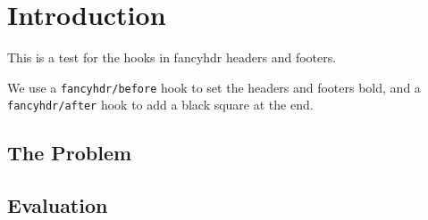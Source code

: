 \documentclass{book}
\begin{document}
\chapter{Introduction}

\begin{boxedminipage}{\textwidth}
This is a test for the hooks in fancyhdr headers and footers.

We use a \texttt{fancyhdr/before} hook to set the headers and footers bold,
and a \texttt{fancyhdr/after} hook to add a black square at the end.
\end{boxedminipage}

\section{The Problem}
\label{sec:problem}

\lipsum[1]

\section{Evaluation}

\lipsum
\end{document}
